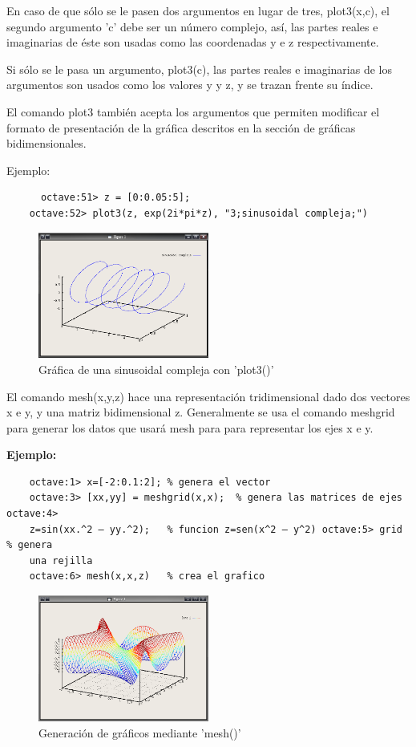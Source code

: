 \documentclass[a4,12pt]{article}
\begin{document}
En caso de que sólo se le pasen dos argumentos en lugar de tres, plot3(x,c), el segundo argumento 'c' debe ser un número complejo, así, las partes reales e imaginarias de éste son usadas como las coordenadas y e z respectivamente.

Si sólo se le pasa un argumento, plot3(c), las partes reales e imaginarias de los argumentos son usados como los valores y y z, y se trazan frente su índice.

El comando plot3 también acepta los argumentos que permiten modificar el formato de presentación de la gráfica descritos en la sección de gráficas bidimensionales.

Ejemplo:\\
\begin{verbatim}
	  octave:51> z = [0:0.05:5];
    octave:52> plot3(z, exp(2i*pi*z), "3;sinusoidal compleja;")
\end{verbatim}
\begin{figure}[H]
  \centering
    \includegraphics[width=0.5\textwidth]{graficos/imagen4}
  \caption{Gráfica de una sinusoidal compleja con 'plot3()'}
\end{figure}

El comando mesh(x,y,z) hace una representación tridimensional dado dos vectores x e y,  y  una  matriz  bidimensional  z.  Generalmente  se  usa  el  comando  meshgrid para generar los datos que usará mesh para para representar los ejes x e y.

\textbf{Ejemplo:}
\begin{verbatim}
	octave:1> x=[-2:0.1:2];	% genera el vector
	octave:3> [xx,yy] = meshgrid(x,x);	% genera las matrices de ejes octave:4> 
	z=sin(xx.^2 – yy.^2);	% funcion z=sen(x^2 – y^2) octave:5> grid	% genera 
	una rejilla
	octave:6> mesh(x,x,z)	% crea el grafico
\end{verbatim}
\begin{figure}[H]
  \centering
    \includegraphics[width=0.5\textwidth]{graficos/imagen5}
  \caption{Generación de gráficos mediante 'mesh()'}
\end{figure}
\end{document}
